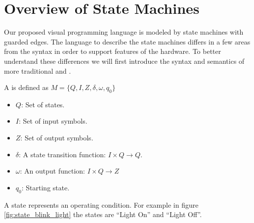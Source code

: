 \section{Overview of State Machines} \label{sec:overviewstatechart}

Our proposed visual programming language is modeled by state machines with guarded edges. The language to describe the state machines differs in a few areas from the   \cite{UML2} syntax in order to support features of the hardware. To better understand these differences we will first introduce the syntax and semantics of more traditional  \cite{booth} and  \cite{UML2}.

\begin{definition}
A  is defined as $M = \lbrace Q, I, Z, \delta, \omega, q_0\rbrace$

\label{def:statecharts}
\begin{itemize}
	\item $Q$: Set of states.
	\item $I$: Set of input symbols.
	\item $Z$: Set of output symbols.
	\item $\delta$: A state transition function: $I \times Q \rightarrow Q$. 
	\item $\omega$: An output function: $I \times Q \rightarrow Z$
	\item $q_0$: Starting state.
\end{itemize}
\end{definition}

A state represents an operating condition. For example in figure \ref{fig:state_blink_light} the states are ``Light On'' and ``Light Off''.

